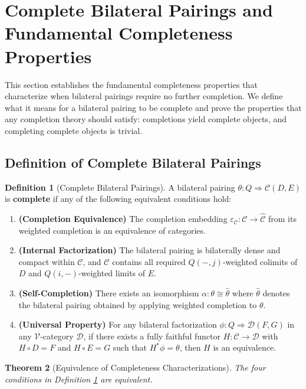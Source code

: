 \documentclass[11pt]{article}
\theoremstyle{plain}
\newtheorem{theorem}{Theorem}[section]
\theoremstyle{definition}
\newtheorem{definition}[theorem]{Definition}
\theoremstyle{remark}
\newcommand{\V}{\mathcal{V}}
\newcommand{\C}{\mathcal{C}}
\newcommand{\D}{\mathcal{D}}
\newcommand{\wh}[1]{\widehat{#1}}
\begin{document}
\section{Complete Bilateral Pairings and Fundamental Completeness Properties}

This section establishes the fundamental completeness properties that characterize when bilateral pairings require no further completion. We define what it means for a bilateral pairing to be complete and prove the properties that any completion theory should satisfy: completions yield complete objects, and completing complete objects is trivial.

\subsection{Definition of Complete Bilateral Pairings}

\begin{definition}[Complete Bilateral Pairings]\label{def:complete-pairing}
A bilateral pairing $\theta : Q \Rightarrow \C(D, E)$ is \textbf{complete} if any of the following equivalent conditions hold:

\begin{enumerate}
\item \textbf{(Completion Equivalence)} The completion embedding $\varepsilon_\C : \C \to \wh{\C}$ from its weighted completion is an equivalence of categories.

\item \textbf{(Internal Factorization)} The bilateral pairing is bilaterally dense and compact within $\C$, and $\C$ contains all required $Q(-, j)$-weighted colimits of $D$ and $Q(i, -)$-weighted limits of $E$.

\item \textbf{(Self-Completion)} There exists an isomorphism $\alpha : \theta \cong \wh{\theta}$ where $\wh{\theta}$ denotes the bilateral pairing obtained by applying weighted completion to $\theta$.

\item \textbf{(Universal Property)} For any bilateral factorization $\phi : Q \Rightarrow \D(F, G)$ in any $\V$-category $\D$, if there exists a fully faithful functor $H : \C \to \D$ with $H \circ D = F$ and $H \circ E = G$ such that $H^* \phi = \theta$, then $H$ is an equivalence.
\end{enumerate}
\end{definition}

\begin{theorem}[Equivalence of Completeness Characterizations]\label{thm:completeness-equivalence}
The four conditions in Definition \ref{def:complete-pairing} are equivalent.
\end{theorem}
\end{document}
